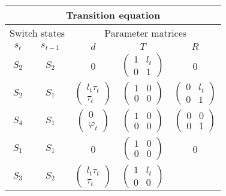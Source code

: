 \documentclass[11pt]{article}
\begin{document}
\begin{table}[h!]
\centering
\begin{tabular}[h!]{cc|ccc}
  \hline\hline
  \multicolumn{5}{c}{Transition equation}\\
  \hline
  \multicolumn{2}{c|}{Switch states} & \multicolumn{3}{c}{Parameter
                                      matrices}\\
  $s_{t}$ & $s_{t-1}$ & $d$ & $T$ & $R$ \\
  \hline
  $S_2$ & $S_2$ & 0 & $\begin{pmatrix} 1 & l_t \\ 0 &
    1 \end{pmatrix}$ & 0\\
  $S_2$ & $S_1$ & $\begin{pmatrix} l_t\tau_t\\ \tau_t\end{pmatrix}$ 
                                    & $\begin{pmatrix} 1 & 0 \\ 0 &
                                      0 \end{pmatrix}$ 
          & $\begin{pmatrix} 0 & l_t\\ 0 & 1 \end{pmatrix}$\\
  $S_4$ & $S_1$ & $\begin{pmatrix}0\\\varphi_t\end{pmatrix}$ 
                                     & $\begin{pmatrix}1&0\\0&0\end{pmatrix}$
          & $\begin{pmatrix}0&0\\0&1\end{pmatrix}$\\
  $S_1$ &  $S_1$ & 0 & $\begin{pmatrix}1&0\\0&0\end{pmatrix}$ & 0\\
  $S_3$ & $S_2$ & $\begin{pmatrix} l_t\tau_t\\ \tau_t\end{pmatrix}$ 
                                    & $\begin{pmatrix} 1 & l_t \\ 0 &
                                      0 \end{pmatrix}$ 

\end{tabular}
\end{table}
\end{document}
